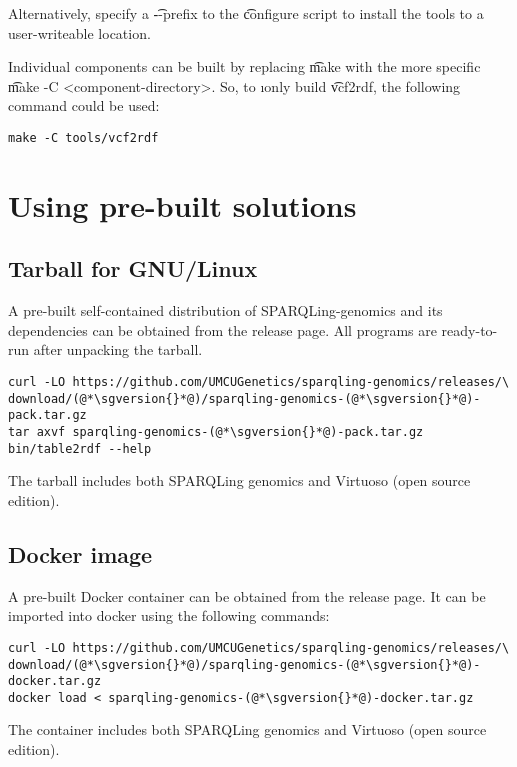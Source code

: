   Alternatively, specify a \t{-{}-prefix} to the \t{configure}
  script to install the tools to a user-writeable location.

  Individual components can be built by replacing \t{make} with the
  more specific \t{make -C <component-directory>}.  So, to \i{only}
  build \t{vcf2rdf}, the following command could be used:

\begin{siderules}
\begin{verbatim}
make -C tools/vcf2rdf
\end{verbatim}
\end{siderules}

\section{Using pre-built solutions}

\subsection{Tarball for GNU/Linux}

  A pre-built self-contained distribution of SPARQLing-genomics and
  its dependencies can be obtained from the release page.  All programs
  are ready-to-run after unpacking the tarball.

\begin{siderules}
\begin{lstlisting}
curl -LO https://github.com/UMCUGenetics/sparqling-genomics/releases/\
download/(@*\sgversion{}*@)/sparqling-genomics-(@*\sgversion{}*@)-pack.tar.gz
tar axvf sparqling-genomics-(@*\sgversion{}*@)-pack.tar.gz
bin/table2rdf --help
\end{lstlisting}
\end{siderules}

  The tarball includes both SPARQLing genomics and Virtuoso (open source
  edition).

\subsection{Docker image}

  A pre-built Docker container can be obtained from the release page.  It
  can be imported into docker using the following commands:

\begin{siderules}
\begin{lstlisting}
curl -LO https://github.com/UMCUGenetics/sparqling-genomics/releases/\
download/(@*\sgversion{}*@)/sparqling-genomics-(@*\sgversion{}*@)-docker.tar.gz
docker load < sparqling-genomics-(@*\sgversion{}*@)-docker.tar.gz
\end{lstlisting}
\end{siderules}

  The container includes both SPARQLing genomics and Virtuoso (open source
  edition).

